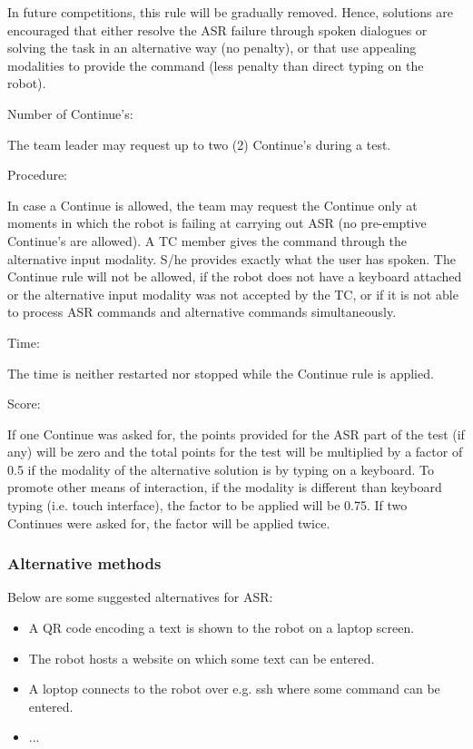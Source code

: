 In future competitions, this rule will be gradually removed. 
Hence, solutions are encouraged that either resolve the ASR failure through spoken dialogues or solving the task in an alternative way (no penalty), or that use appealing modalities to provide the command (less penalty than direct typing on the robot).

\begin{enumerate}
{\bf\item Number of Continue's:} The team leader may request up to two (2) Continue's during a test. 
{\bf\item Procedure:} In case a Continue is allowed, the team may request the Continue only at moments in which the robot is failing at carrying out ASR (no pre-emptive Continue's are allowed).
A TC member gives the command through the alternative input modality. S/he provides exactly what the user has spoken. 
The Continue rule will not be allowed, if the robot does not have a keyboard attached or the alternative input modality was not accepted by the TC, or if it is not able to process ASR commands and alternative commands simultaneously.
{\bf\item Time:} The time is neither restarted nor stopped while the Continue rule is applied.
{\bf\item Score:} If one Continue was asked for, the points provided for the ASR part of the test (if any) will be zero and the total points for the test will be multiplied by a factor of 0.5 if the modality of the alternative solution is by typing on a keyboard. To promote other means of interaction, if the modality is different than keyboard typing (i.e. touch interface), the factor to be applied will be 0.75. If two Continues were asked for, the factor will be applied twice.
\end{enumerate}

\subsubsection{Alternative methods}
Below are some suggested alternatives for ASR:
\begin{itemize}
 \item A QR code encoding a text is shown to the robot on a laptop screen.
 \item The robot hosts a website on which some text can be entered.
 \item A loptop connects to the robot over e.g. ssh where some command can be entered. 
 \item ...
\end{itemize}




